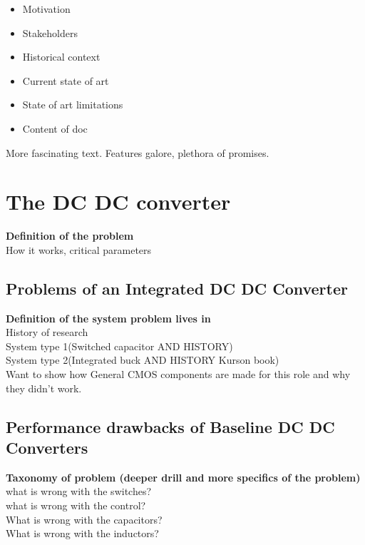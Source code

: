 \documentclass[letterpaper,twocolumn,10pt]{article}
\begin{document}
\begin{itemize}
\item{Motivation}
\item{Stakeholders}
\item{Historical context}
\item{Current state of art}
\item{State of art limitations}
\item{Content of doc}
\end{itemize}

More fascinating text. Features galore, plethora of promises.\\

\section{The DC DC converter}

\textbf{Definition of the problem}\\
How it works, critical parameters

\subsection{Problems of an Integrated DC DC Converter}

\textbf{Definition of the system problem lives in}\\
History of research\\
System type 1(Switched capacitor AND HISTORY)\\
System type 2(Integrated buck AND HISTORY Kurson book)\\
Want to show how General CMOS components are made for this role and why they didn't work.\\

\subsection{Performance drawbacks of Baseline DC DC Converters}

\textbf{Taxonomy of problem (deeper drill and more specifics of the problem)}\\
what is wrong with the switches?\\
what is wrong with the control? \\
What is wrong with the capacitors?\\
What is wrong with the inductors?\\
\end{document}
